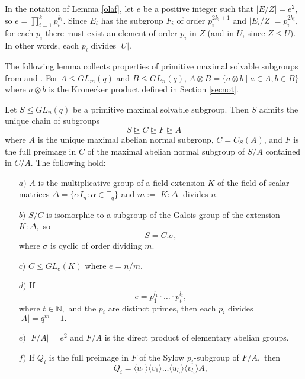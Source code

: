\begin{Rem}\label{eqrem}
In the notation of Lemma \ref{olaf}, let $e$ be a positive integer such that $|E/Z|=e^2,$ so $e= \prod_{i=1}^k p_i^{k_i}.$ Since $E_i$ has the subgroup $F_i$ of order $p_i^{2k_i+1}$ and $|E_i/Z|=p_i^{2k_i},$ for each $p_i$ there must exist an element of order $p_i$ in $Z$ (and in $U$, since $Z \le U$). In other words, each $p_i$ divides $|U|.$ 
\end{Rem}

The following lemma collects properties of primitive maximal solvable subgroups from \cite[\S \S 19 -- 20]{sup} and \cite[\S 2.5]{short}.  For $A \le GL_m(q)$ and $B \le GL_n(q)$, $A \otimes B = \{a \otimes b \mid a \in A, b \in B\}$ where $a \otimes b$ is the Kronecker product defined in Section \ref{secnot}.  

\begin{Lem}\label{suplem}
Let $S \le GL_n(q)$ be a primitive maximal solvable subgroup. Then $S$
admits the unique chain of subgroups 
\begin{equation}\label{ryad}
S \trianglerighteq C \trianglerighteq F \trianglerighteq A
\end{equation}
 where $A$ is the unique maximal abelian normal subgroup,  $C =C_S(A)$, and  $F$ is the full preimage in $C$ of the maximal  abelian normal subgroup of $S/A$ contained in $C/A.$ The following hold: 
\begin{enumerate}[font=\normalfont]
\item[$a)$] $A$ is the multiplicative group of a field extension $K$ of the field of scalar matrices $ \Delta = \{\alpha I_n: \alpha \in \mathbb{F}_q\}$ and $m:=|K : \Delta|$ divides  $n$.
\item[$b)$]  $S/C$ is isomorphic to a subgroup of the Galois group of the extension $K:\Delta,$ so 
$$S=C.\sigma,$$
where $\sigma$ is cyclic of order dividing $m$. 
\item[$c)$] $C \le GL_e(K)$ where $e=n/m$.
\item[$d)$] If
\begin{equation}\label{r}
 e=p_1^{l_1} \cdot \ldots \cdot p_t^{l_t},
\end{equation}
where $t \in \mathbb{N},$ and the $p_i$ are distinct primes, then each $p_i$ divides $|A|=q^m-1.$
\item[$e)$] $|F/A|=e^2$ and $F/A$ is the direct product of elementary abelian groups. 
\item[$f)$] If $Q_i$ is the full preimage in $F$ of the Sylow $p_i$-subgroup of $F/A,$ then
$$Q_i= \langle u_1 \rangle \langle v_1 \rangle \ldots \langle u_{l_i} \rangle \langle v_{l_i} \rangle A,$$

\end{enumerate}
\end{Lem}
